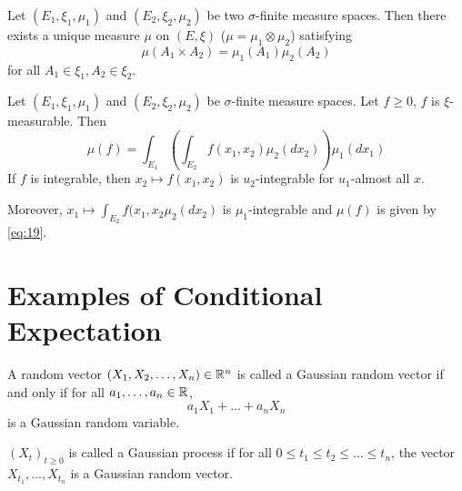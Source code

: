 \begin{defn}
  \label{defn:inequalities:4}
  Let $(E_{1}, \xi_{1}, \mu_{1})$ and $(E_{2}, \xi_{2}, \mu_{2})$ be
  two $\sigma$-finite measure spaces. Then there exists a unique
  measure $\mu$ on $(E, \xi)$ ($\mu = \mu_{1} \otimes \mu_{2}$)
  satisfying
  \begin{equation}
    \label{eq:18}
    \mu(A_{1} \times A_{2}) = \mu_{1}(A_{1})\mu_{2}(A_{2})
  \end{equation} for all $A_{1} \in \xi_{1}, A_{2} \in \xi_{2}$.
\end{defn}

\begin{thm}
  \label{defn:inequalities:5}
  Let $(E_{1}, \xi_{1}, \mu_{1})$ and $(E_{2}, \xi_{2}, \mu_{2})$ be
  $\sigma$-finite measure spaces.  Let $f \geq 0$, $f$ is
  $\xi$-measurable.  Then
  \begin{equation}
    \label{eq:19}
    \mu(f)  = \int_{E_{1}} \left( \int_{E_{2}} f(x_{1}, x_{2})
      \mu_{2}(dx_{2}) \right) \mu_{1}(dx_{1})
  \end{equation}
  If $f$ is integrable, then $x_{2} \mapsto f(x_{1}, x_{2})$ is
  $u_{2}$-integrable for $u_{1}$-almost all $x$.

  Moreover, $x_{1} \mapsto \int_{E_{2}} f(x_{1}, x_{2}
  \mu_{2}(dx_{2})$ is $\mu_{1}$-integrable and $\mu(f)$ is given by \eqref{eq:19}.
\end{thm}

\section{Examples of Conditional Expectation}
\label{sec:exampl-cond-expect}

\begin{defn}
  \label{defn:inequalities:6}
  A random vector $(X_1, X_{2}, \dots, X_{n}) \in \mathbb{R}^{n}$ is called a
  Gaussian random vector if and only if for all $a_{1}, \dots, a_{n} \in \mathbb{R}$,
  \begin{equation}
    \label{eq:20}
    a_{1} X_{1} + \dots + a_{n} X_{n}
  \end{equation} is a Gaussian random variable.

  $(X_{t})_{t \geq 0}$ is called a Gaussian process if for all $0 \leq
  t_{1} \leq t_{2} \leq \dots \leq t_{n}$, the vector $X_{t_{1}},
  \dots, X_{t_{n}}$ is a Gaussian random vector.
\end{defn}

